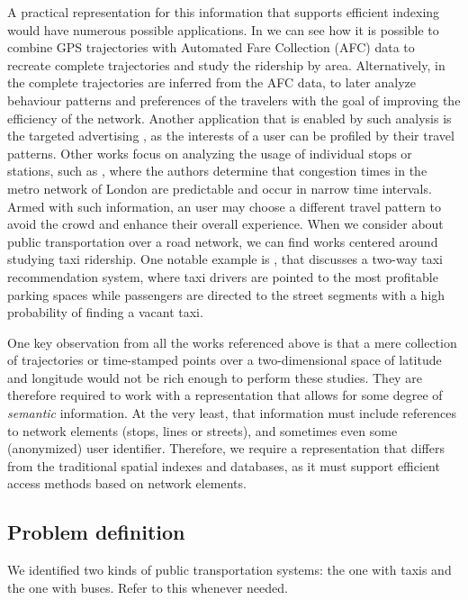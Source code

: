\documentclass{UniVieCS_PhD} %
\begin{document}
	A practical representation for this information that supports efficient indexing would have numerous possible applications. In \cite{tu2018spatial} we can see how it is possible to combine GPS trajectories with Automated Fare Collection (AFC) data to recreate complete trajectories and study the ridership by area. Alternatively, in \cite{weng2018mining} the complete trajectories are inferred from the AFC data, to later analyze behaviour patterns and preferences of the travelers with the goal of improving the efficiency of the network. Another application that is enabled by such analysis is the targeted advertising \cite{zhang2017targeted}, as the interests of a user can be profiled by their travel patterns. Other works focus on analyzing the usage of individual stops or stations, such as \cite{ceapa2012avoiding}, where the authors determine that congestion times in the metro network of London are predictable and occur in narrow time intervals. Armed with such information, an user may choose a different travel pattern to avoid the crowd and enhance their overall experience. When we consider about public transportation over a road network, we can find works centered around studying taxi ridership. One notable example is \cite{yuan2013t}, that discusses a two-way taxi recommendation system, where taxi drivers are pointed to the most profitable parking spaces while passengers are directed to the street segments with a high probability of finding a vacant taxi.
	
	One key observation from all the works referenced above is that a mere collection of trajectories or time-stamped points over a two-dimensional space of latitude and longitude would not be rich enough to perform these studies. They are therefore required to work with a representation that allows for some degree of \textit{semantic} information. At the very least, that information must include references to network elements (stops, lines or streets), and sometimes even some (anonymized) user identifier. Therefore, we require a representation that differs from the traditional spatial indexes and databases, as it must support efficient access methods based on network elements.
	
	\subsection{Problem definition}
	\label{sec:pd}
	We identified two kinds of public transportation systems: the one with taxis and the one with buses. Refer to this whenever needed.
	
\end{document}
